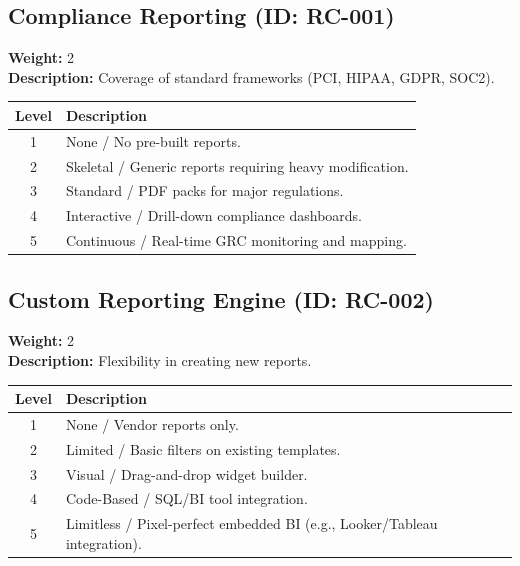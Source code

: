 \documentclass{article}
\begin{document}
\subsection{Compliance Reporting (ID: RC-001)}
\textbf{Weight:} 2 \\
\textbf{Description:} Coverage of standard frameworks (PCI, HIPAA, GDPR, SOC2).
\vspace{0.3cm}
\begin{longtable}{|c|p{12cm}|}
\hline
\rowcolor{lightgray} \textbf{Level} & \textbf{Description} \\ \hline
1 & None / No pre-built reports. \\ \hline
2 & Skeletal / Generic reports requiring heavy modification. \\ \hline
3 & Standard / PDF packs for major regulations. \\ \hline
4 & Interactive / Drill-down compliance dashboards. \\ \hline
5 & Continuous / Real-time GRC monitoring and mapping. \\ \hline
\end{longtable}
\vspace{0.5cm}
\subsection{Custom Reporting Engine (ID: RC-002)}
\textbf{Weight:} 2 \\
\textbf{Description:} Flexibility in creating new reports.
\vspace{0.3cm}
\begin{longtable}{|c|p{12cm}|}
\hline
\rowcolor{lightgray} \textbf{Level} & \textbf{Description} \\ \hline
1 & None / Vendor reports only. \\ \hline
2 & Limited / Basic filters on existing templates. \\ \hline
3 & Visual / Drag-and-drop widget builder. \\ \hline
4 & Code-Based / SQL/BI tool integration. \\ \hline
5 & Limitless / Pixel-perfect embedded BI (e.g., Looker/Tableau integration). \\ \hline
\end{longtable}
\vspace{0.5cm}
\end{document}
